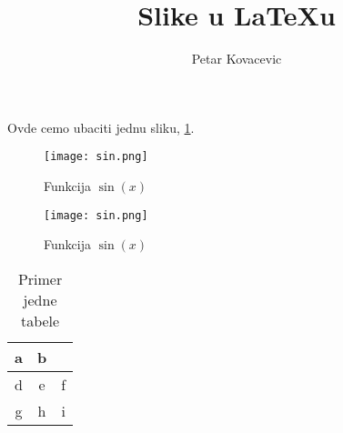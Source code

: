 \documentclass{article}
\title{Slike u LaTeXu}
\author{Petar Kovacevic}
\begin{document}
\maketitle

Ovde cemo ubaciti jednu sliku, \ref{slika:sinus}.

\begin{figure}[h!] %
	\centering
	\texttt{[image: sin.png]}
	\caption{Funkcija $\sin \left( x \right)$}
	\label{slika:sinus}
\end{figure}

\begin{figure}[h!]
	\centering
	\texttt{[image: sin.png]}
	\caption{Funkcija $\sin (x)$}
	\label{slika:sin2}
\end{figure}
 
\begin{table}[h!]
	\centering
	\caption{Primer jedne tabele}
	\bigskip
	\begin{tabular}{|c|c|c|} %
		\hline
		a & b & \phantom{xxx} \\
		\hline
		d & e & f \\
		\hline
		g & h & i \\ 
		\hline
	\end{tabular}
	\label{tabela:ime}
\end{table}
\end{document}
